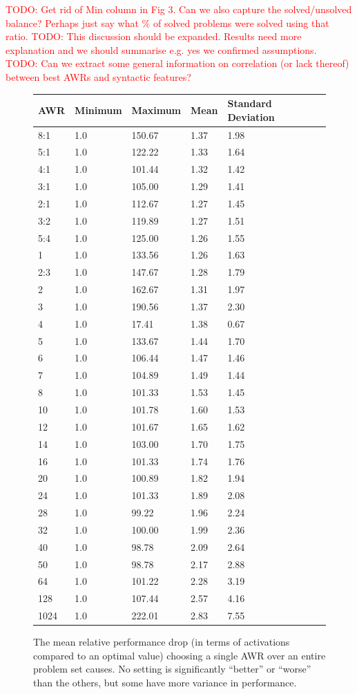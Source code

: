 \documentclass{llncs}
\newcommand{\todo}[1]{\textcolor{red}{TODO: #1}}
\begin{document}
\noindent
 \todo{Get rid of Min column in Fig 3. Can we also capture the solved/unsolved balance? Perhaps just say what \% of solved problems were solved using that ratio.}
\todo{This discussion should be expanded. Results need more explanation and we should summarise e.g. yes we confirmed assumptions.}\\
\todo{Can we extract some general information on correlation (or lack thereof) between best AWRs and syntactic features?}

\begin{figure}[t]
	\centering
	\begin{tabular}{l l l l l}
AWR & Minimum & Maximum & Mean & Standard Deviation\\
\hline
8:1 & 1.0 & 150.67 & 1.37 & 1.98\\
5:1 & 1.0 & 122.22 & 1.33 & 1.64\\
4:1 & 1.0 & 101.44 & 1.32 & 1.42\\
3:1 & 1.0 & 105.00 & 1.29 & 1.41\\
2:1 & 1.0 & 112.67 & 1.27 & 1.45\\
3:2 & 1.0 & 119.89 & 1.27 & 1.51\\
5:4 & 1.0 & 125.00 & 1.26 & 1.55\\
1 & 1.0 & 133.56 & 1.26 & 1.63\\
2:3 & 1.0 & 147.67 & 1.28 & 1.79\\
2 & 1.0 & 162.67 & 1.31 & 1.97\\
3 & 1.0 & 190.56 & 1.37 & 2.30\\
4 & 1.0 & 17.41 & 1.38 & 0.67\\
5 & 1.0 & 133.67 & 1.44 & 1.70\\
6 & 1.0 & 106.44 & 1.47 & 1.46\\
7 & 1.0 & 104.89 & 1.49 & 1.44\\
8 & 1.0 & 101.33 & 1.53 & 1.45\\
10 & 1.0 & 101.78 & 1.60 & 1.53\\
12 & 1.0 & 101.67 & 1.65 & 1.62\\
14 & 1.0 & 103.00 & 1.70 & 1.75\\
16 & 1.0 & 101.33 & 1.74 & 1.76\\
20 & 1.0 & 100.89 & 1.82 & 1.94\\
24 & 1.0 & 101.33 & 1.89 & 2.08\\
28 & 1.0 & 99.22 & 1.96 & 2.24\\
32 & 1.0 & 100.00 & 1.99 & 2.36\\
40 & 1.0 & 98.78 & 2.09 & 2.64\\
50 & 1.0 & 98.78 & 2.17 & 2.88\\
64 & 1.0 & 101.22 & 2.28 & 3.19\\
128 & 1.0 & 107.44 & 2.57 & 4.16\\
1024 & 1.0 & 222.01 & 2.83 & 7.55
	\end{tabular}
	\caption{The mean relative performance drop (in terms of activations compared to an optimal value) choosing a single AWR over an entire problem set causes. No setting is significantly ``better'' or ``worse'' than the others, but some have more variance in performance.}
	\label{fig:no-best-awr}
\end{figure}
\end{document}
